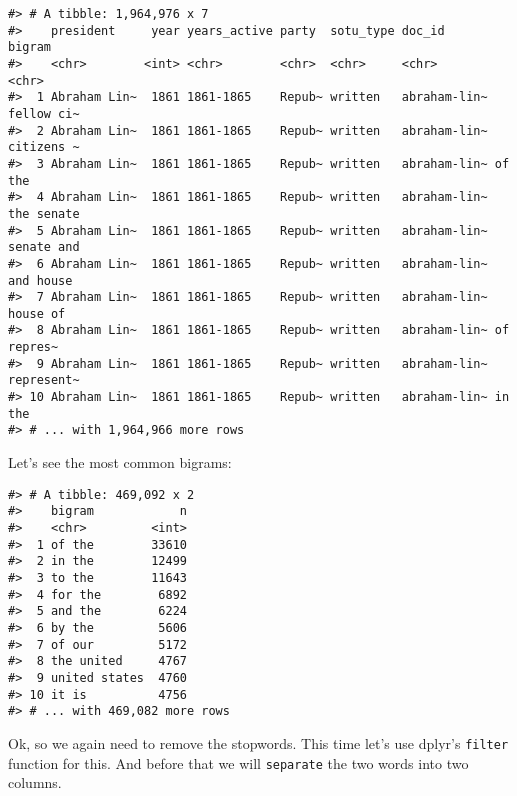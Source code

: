 \documentclass[]{book}
\newenvironment{Shaded}{\begin{snugshade}}{\end{snugshade}}
\newcommand{\CommentTok}[1]{\textcolor[rgb]{0.56,0.35,0.01}{\textit{#1}}}
\newcommand{\DataTypeTok}[1]{\textcolor[rgb]{0.13,0.29,0.53}{#1}}
\newcommand{\DecValTok}[1]{\textcolor[rgb]{0.00,0.00,0.81}{#1}}
\newcommand{\KeywordTok}[1]{\textcolor[rgb]{0.13,0.29,0.53}{\textbf{#1}}}
\newcommand{\NormalTok}[1]{#1}
\newcommand{\OperatorTok}[1]{\textcolor[rgb]{0.81,0.36,0.00}{\textbf{#1}}}
\newcommand{\OtherTok}[1]{\textcolor[rgb]{0.56,0.35,0.01}{#1}}
\newcommand{\StringTok}[1]{\textcolor[rgb]{0.31,0.60,0.02}{#1}}
\begin{document}
\begin{verbatim}
#> # A tibble: 1,964,976 x 7
#>    president     year years_active party  sotu_type doc_id       bigram    
#>    <chr>        <int> <chr>        <chr>  <chr>     <chr>        <chr>     
#>  1 Abraham Lin~  1861 1861-1865    Repub~ written   abraham-lin~ fellow ci~
#>  2 Abraham Lin~  1861 1861-1865    Repub~ written   abraham-lin~ citizens ~
#>  3 Abraham Lin~  1861 1861-1865    Repub~ written   abraham-lin~ of the    
#>  4 Abraham Lin~  1861 1861-1865    Repub~ written   abraham-lin~ the senate
#>  5 Abraham Lin~  1861 1861-1865    Repub~ written   abraham-lin~ senate and
#>  6 Abraham Lin~  1861 1861-1865    Repub~ written   abraham-lin~ and house 
#>  7 Abraham Lin~  1861 1861-1865    Repub~ written   abraham-lin~ house of  
#>  8 Abraham Lin~  1861 1861-1865    Repub~ written   abraham-lin~ of repres~
#>  9 Abraham Lin~  1861 1861-1865    Repub~ written   abraham-lin~ represent~
#> 10 Abraham Lin~  1861 1861-1865    Repub~ written   abraham-lin~ in the    
#> # ... with 1,964,966 more rows
\end{verbatim}

Let's see the most common bigrams:

\begin{Shaded}
\end{Shaded}

\begin{verbatim}
#> # A tibble: 469,092 x 2
#>    bigram            n
#>    <chr>         <int>
#>  1 of the        33610
#>  2 in the        12499
#>  3 to the        11643
#>  4 for the        6892
#>  5 and the        6224
#>  6 by the         5606
#>  7 of our         5172
#>  8 the united     4767
#>  9 united states  4760
#> 10 it is          4756
#> # ... with 469,082 more rows
\end{verbatim}

Ok, so we again need to remove the stopwords. This time let's use dplyr's \texttt{filter} function for this. And before that we will \texttt{separate} the two words into two columns.
\end{document}
